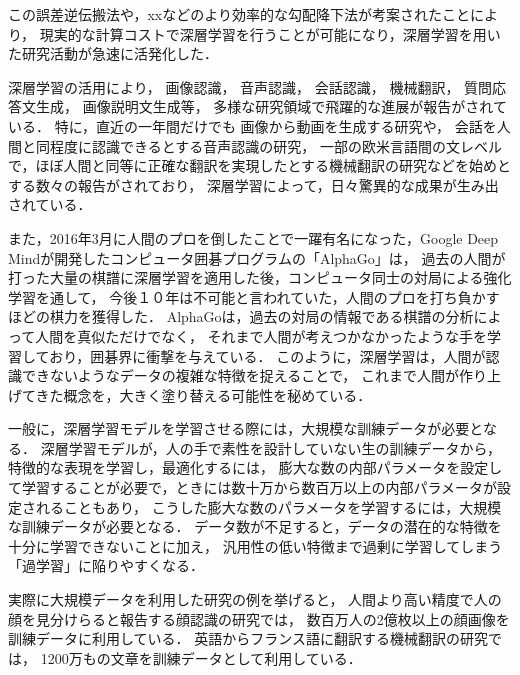 この誤差逆伝搬法や，xxなどのより効率的な勾配降下法が考案されたことにより，
現実的な計算コストで深層学習を行うことが可能になり，深層学習を用いた研究活動が急速に活発化した．


深層学習の活用により，
画像認識\cite{schroff2015facenet,szegedy2014going}，
音声認識\cite{hinton2012deep, bahdanau2015end}，
会話認識\cite{sak2015fast}，
機械翻訳\cite{sutskever2014sequence, dong2015multi}，
質問応答文生成\cite{yin2015neural}，
画像説明文生成\cite{xu2015show,vinyals2014show}等，
多様な研究領域で飛躍的な進展が報告がされている．
特に，直近の一年間だけでも
画像から動画を生成する研究\cite{vondrick2016generating}や，
会話を人間と同程度に認識できるとする音声認識の研究\cite{xiong2016achieving}，
一部の欧米言語間の文レベルで，ほぼ人間と同等に正確な翻訳を実現したとする機械翻訳の研究\cite{wu2016google}などを始めとする数々の報告がされており，
深層学習によって，日々驚異的な成果が生み出されている．

また，2016年3月に人間のプロを倒したことで一躍有名になった，Google Deep Mindが開発したコンピュータ囲碁プログラムの「AlphaGo」\cite{silver2016mastering}は，
過去の人間が打った大量の棋譜に深層学習を適用した後，コンピュータ同士の対局による強化学習を通して，
今後１０年は不可能と言われていた，人間のプロを打ち負かすほどの棋力を獲得した．
AlphaGoは，過去の対局の情報である棋譜の分析によって人間を真似ただけでなく，
それまで人間が考えつかなかったような手を学習しており，囲碁界に衝撃を与えている．
このように，深層学習は，人間が認識できないようなデータの複雑な特徴を捉えることで，
これまで人間が作り上げてきた概念を，大きく塗り替える可能性を秘めている．


一般に，深層学習モデルを学習させる際には，大規模な訓練データが必要となる．
深層学習モデルが，人の手で素性を設計していない生の訓練データから，特徴的な表現を学習し，最適化するには，
膨大な数の内部パラメータを設定して学習することが必要で，ときには数十万から数百万以上の内部パラメータが設定されることもあり，
こうした膨大な数のパラメータを学習するには，大規模な訓練データが必要となる．
データ数が不足すると，データの潜在的な特徴を十分に学習できないことに加え，
汎用性の低い特徴まで過剰に学習してしまう「過学習」に陥りやすくなる\cite{tetko1995neural}．

実際に大規模データを利用した研究の例を挙げると，
人間より高い精度で人の顔を見分けらると報告する顔認識の研究\cite{schroff2015facenet}では，
数百万人の2億枚以上の顔画像を訓練データに利用している．
英語からフランス語に翻訳する機械翻訳の研究\cite{xu2015show}では，
1200万もの文章を訓練データとして利用している．


